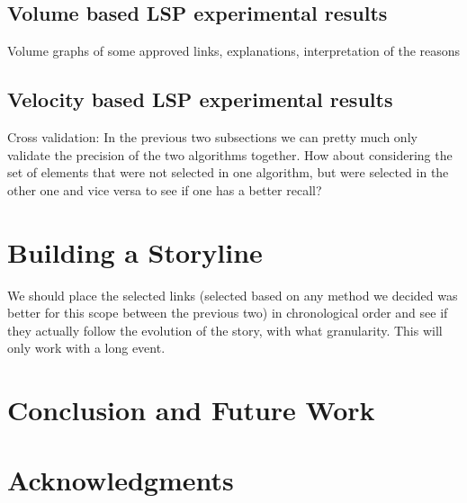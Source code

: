 \documentclass{sig-alternate}
\begin{document}
\subsection{Volume based LSP experimental results}
\label{sec:volumeResults}

Volume graphs of some approved links, explanations, interpretation of the reasons

\subsection{Velocity based LSP experimental results}
\label{sec:velocityResults}

Cross validation: In the previous two subsections we can pretty much only validate the precision of the two algorithms together. How about considering the set of elements that were not selected in one algorithm, but were selected in the other one and vice versa to see if one has a better recall?


\section{Building a Storyline}
\label{sec:storyline}
We should place the selected links (selected based on any method we decided was better for this scope between the previous two) in chronological order and see if they actually follow the evolution of the story, with what granularity. This will only work with a long event.



\section{Conclusion and Future Work}
\label{sec:conclusions}


\section{Acknowledgments}
\label{sec:ack}

\nocite{*}


\balancecolumns
\end{document}
